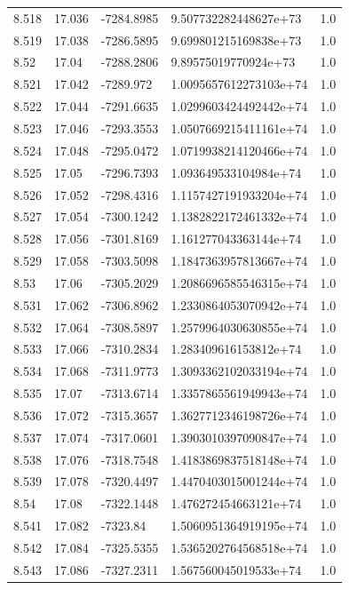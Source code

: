 \begin{tabular}{lllll}
8.518 & 17.036 & -7284.8985 & 9.507732282448627e+73 & 1.0 \\
8.519 & 17.038 & -7286.5895 & 9.699801215169838e+73 & 1.0 \\
8.52 & 17.04 & -7288.2806 & 9.89575019770924e+73 & 1.0 \\
8.521 & 17.042 & -7289.972 & 1.0095657612273103e+74 & 1.0 \\
8.522 & 17.044 & -7291.6635 & 1.0299603424492442e+74 & 1.0 \\
8.523 & 17.046 & -7293.3553 & 1.0507669215411161e+74 & 1.0 \\
8.524 & 17.048 & -7295.0472 & 1.0719938214120466e+74 & 1.0 \\
8.525 & 17.05 & -7296.7393 & 1.093649533104984e+74 & 1.0 \\
8.526 & 17.052 & -7298.4316 & 1.1157427191933204e+74 & 1.0 \\
8.527 & 17.054 & -7300.1242 & 1.1382822172461332e+74 & 1.0 \\
8.528 & 17.056 & -7301.8169 & 1.161277043363144e+74 & 1.0 \\
8.529 & 17.058 & -7303.5098 & 1.1847363957813667e+74 & 1.0 \\
8.53 & 17.06 & -7305.2029 & 1.2086696585546315e+74 & 1.0 \\
8.531 & 17.062 & -7306.8962 & 1.2330864053070942e+74 & 1.0 \\
8.532 & 17.064 & -7308.5897 & 1.2579964030630855e+74 & 1.0 \\
8.533 & 17.066 & -7310.2834 & 1.283409616153812e+74 & 1.0 \\
8.534 & 17.068 & -7311.9773 & 1.3093362102033194e+74 & 1.0 \\
8.535 & 17.07 & -7313.6714 & 1.3357865561949943e+74 & 1.0 \\
8.536 & 17.072 & -7315.3657 & 1.3627712346198726e+74 & 1.0 \\
8.537 & 17.074 & -7317.0601 & 1.3903010397090847e+74 & 1.0 \\
8.538 & 17.076 & -7318.7548 & 1.4183869837518148e+74 & 1.0 \\
8.539 & 17.078 & -7320.4497 & 1.4470403015001244e+74 & 1.0 \\
8.54 & 17.08 & -7322.1448 & 1.476272454663121e+74 & 1.0 \\
8.541 & 17.082 & -7323.84 & 1.5060951364919195e+74 & 1.0 \\
8.542 & 17.084 & -7325.5355 & 1.5365202764568518e+74 & 1.0 \\
8.543 & 17.086 & -7327.2311 & 1.567560045019533e+74 & 1.0 \\

\end{tabular}
